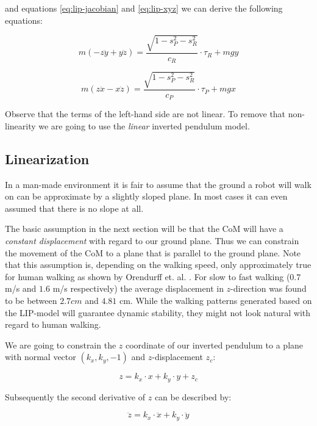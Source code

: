 \documentclass[english,ngerman]{KITreprt}
\begin{document}
and equations \ref{eq:lip-jacobian} and \ref{eq:lip-xyz} we can derive
the following equations:

\begin{equation} \label{eq:lip-dyn-y}
m(-z\ddot{y} + y\ddot{z}) = \frac{\sqrt{1 - s_P^2 - s_R^2}}{c_R} \cdot \tau_R + m g y
\end{equation}

\begin{equation} \label{eq:lip-dyn-x}
m(z\ddot{x} - x\ddot{z}) = \frac{\sqrt{1 - s_P^2 - s_R^2}}{c_P} \cdot \tau_P + m g x
\end{equation}

Observe that the terms of the left-hand side are not linear. To remove
that non-linearity we are going to use the \emph{linear} inverted
pendulum model.

\subsection{Linearization}\label{linearization}

In a man-made environment it is fair to assume that the ground a robot
will walk on can be approximate by a slightly sloped plane. In most
cases it can even assumed that there is no slope at all.

The basic assumption in the next section will be that the CoM will have
a \emph{constant displacement} with regard to our ground plane. Thus we
can constrain the movement of the CoM to a plane that is parallel to the
ground plane. Note that this assumption is, depending on the walking
speed, only approximately true for human walking as shown by Orendurff
et. al. \citep{orendurff2004effect}. For slow to fast walking ($0.7$ m/s
and $1.6$ m/s respectively) the average displacement in $z$-direction
was found to be between $2.7cm$ and $4.81$ cm. While the walking
patterns generated based on the LIP-model will guarantee dynamic
stability, they might not look natural with regard to human walking.

We are going to constrain the $z$ coordinate of our inverted pendulum to
a plane with normal vector $(k_x, k_y, -1)$ and $z$-displacement $z_c$:

\begin{equation} \label{eq:lip-z-plane}
z = k_x \cdot x + k_y \cdot y + z_c
\end{equation}

Subsequently the second derivative of $z$ can be described by:

\begin{equation} \label{eq:lip-z-div}
\ddot{z} = k_x \cdot \ddot{x} + k_y \cdot \ddot{y}
\end{equation}
\end{document}
